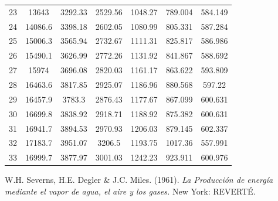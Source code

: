 \documentclass[11pt,letterpaper]{extarticle}        %
\numberwithin{equation}{section}                    %
\begin{document}
\begin{table}[H]
\begin{tabular}{|ccccccc|}
23 & 13643   & 3292.33 & 2529.56 & 1048.27 & 789.004 & 584.149 \\
24 & 14086.6 & 3398.18 & 2602.05 & 1080.99 & 805.331 & 587.284 \\
25 & 15006.3 & 3565.94 & 2732.67 & 1111.31 & 825.817 & 586.986 \\
26 & 15490.1 & 3626.99 & 2772.26 & 1131.92 & 841.867 & 588.692 \\
27 & 15974   & 3696.08 & 2820.03 & 1161.17 & 863.622 & 593.809 \\
28 & 16463.6 & 3817.85 & 2925.07 & 1186.96 & 880.568 & 597.22  \\
29 & 16457.9 & 3783.3  & 2876.43 & 1177.67 & 867.099 & 600.631 \\
30 & 16699.8 & 3838.92 & 2918.71 & 1188.92 & 875.382 & 600.631 \\
31 & 16941.7 & 3894.53 & 2970.93 & 1206.03 & 879.145 & 602.337 \\
32 & 17183.7 & 3951.07 & 3206.5  & 1193.75 & 1017.36 & 557.991 \\
33 & 16999.7 & 3877.97 & 3001.03 & 1242.23 & 923.911 & 600.976 \\
\hline
\end{tabular}
\end{table}

\begin{thebibliography}{x}
	
W.H. Severns, H.E. Degler \& J.C. Miles. (1961). \textit{La Producción de energía mediante el vapor de agua, el aire y los gases.} New York: REVERTÉ.
	
\end{thebibliography}
\end{document}
